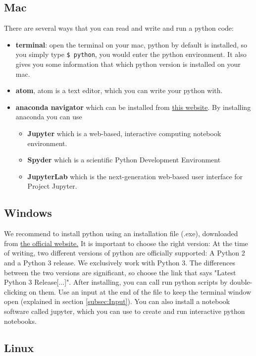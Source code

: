 \documentclass[10pt,a4paper]{article}
\begin{document}
\subsection{Mac}
There are several ways that you can read and write and run a python code:
\begin{itemize}
    \item \textbf{terminal}: open the terminal on your mac, python by default is installed, so you simply type \texttt{\$ python}, you would enter the python environment. It also gives you some information that which python version is installed on your mac.
    \item \textbf{atom}, atom is a text editor, which you can write your python with.
    \item \textbf{anaconda navigator} which can be installed from \href{https://www.anaconda.com}{this website}. By installing anaconda you can use
    \begin{itemize}
    \item\textbf{Jupyter} which is a web-based, interactive computing notebook environment. 
    \item \textbf{Spyder} which is a scientific Python Development Environment
    \item \textbf{JupyterLab } which is the next-generation web-based user interface for Project Jupyter.
    \end{itemize}
\end{itemize}


\subsection{Windows}
We recommend to install python using an installation file (.exe), downloaded from \href{https://www.python.org/downloads/windows/}{the official website.}
It is important to choose the right version: At the time of writing, two different versions of python are officially supported: A Python 2 and a Python 3 release. We exclusively work with Python 3. The differences between the two versions are significant, so choose the link that says "Latest Python 3 Release[...]".
After installing, you can call run python scripts by double-clicking on them. Use an input at the end of the file to keep the terminal window open (explained in section \ref{subsec:Input}). You can also install a notebook software called jupyter, which you can use to create and run interactive python notebooks.


\subsection{Linux}
\end{document}
